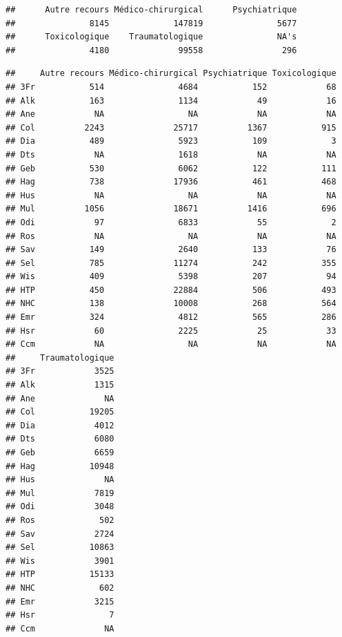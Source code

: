 \documentclass[]{article}
\newenvironment{Shaded}{\begin{snugshade}}{\end{snugshade}}
\newcommand{\KeywordTok}[1]{\textcolor[rgb]{0.13,0.29,0.53}{\textbf{{#1}}}}
\newcommand{\CommentTok}[1]{\textcolor[rgb]{0.56,0.35,0.01}{\textit{{#1}}}}
\newcommand{\NormalTok}[1]{{#1}}
\begin{document}
\begin{Shaded}
\end{Shaded}

\begin{verbatim}
##      Autre recours Médico-chirurgical      Psychiatrique 
##               8145             147819               5677 
##      Toxicologique    Traumatologique               NA's 
##               4180              99558                296
\end{verbatim}

\begin{Shaded}
\end{Shaded}

\begin{verbatim}
##     Autre recours Médico-chirurgical Psychiatrique Toxicologique
## 3Fr           514               4684           152            68
## Alk           163               1134            49            16
## Ane            NA                 NA            NA            NA
## Col          2243              25717          1367           915
## Dia           489               5923           109             3
## Dts            NA               1618            NA            NA
## Geb           530               6062           122           111
## Hag           738              17936           461           468
## Hus            NA                 NA            NA            NA
## Mul          1056              18671          1416           696
## Odi            97               6833            55             2
## Ros            NA                 NA            NA            NA
## Sav           149               2640           133            76
## Sel           785              11274           242           355
## Wis           409               5398           207            94
## HTP           450              22884           506           493
## NHC           138              10008           268           564
## Emr           324               4812           565           286
## Hsr            60               2225            25            33
## Ccm            NA                 NA            NA            NA
##     Traumatologique
## 3Fr            3525
## Alk            1315
## Ane              NA
## Col           19205
## Dia            4012
## Dts            6080
## Geb            6659
## Hag           10948
## Hus              NA
## Mul            7819
## Odi            3048
## Ros             502
## Sav            2724
## Sel           10863
## Wis            3901
## HTP           15133
## NHC             602
## Emr            3215
## Hsr               7
## Ccm              NA
\end{verbatim}
\end{document}
